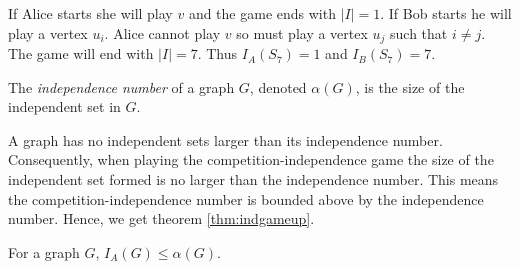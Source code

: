 If Alice starts she will play $v$ and the game ends with $|I| = 1$. If Bob starts he will play a vertex $u_i$. Alice cannot play $v$ so must play a vertex $u_j$ such that $i\neq j$. The game will end with $|I| = 7$. Thus $I_A(S_7)=1$ and $I_B(S_7)=7$.

\begin{definition}
    The \textit{independence number} of a graph $G$, denoted $\alpha(G)$, is the size of the independent set in $G$.
\end{definition}

A graph has no independent sets larger than its independence number. Consequently, when playing the competition-independence game the size of the independent set formed is no larger than the  independence number. This means the competition-independence number is bounded above by the independence number. Hence, we get theorem \ref{thm:indgameup}.

\begin{theorem}\label{thm:indgameup}
    For a graph $G$, $I_A(G)\leq \alpha(G)$.    
\end{theorem}


%
%
%
%













